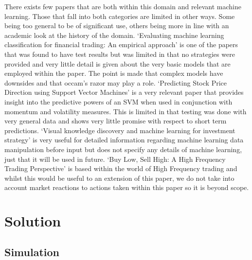 \documentclass[conference]{IEEEtran}
\begin{document}
There exists few papers that are both within this domain and relevant machine learning. Those that fall into both categories are limited in other ways. Some being too general to be of significant use, others being more in line with an academic look at the history of the domain. `Evaluating machine learning classification for financial trading: An empirical approach' \cite{Gerlein2016} is one of the papers that was found to have test results but was limited in that no strategies were provided and very little detail is given about the very basic models that are employed within the paper. The point is made that complex models have downsides and that occam's razor may play a role. `Predicting Stock Price Direction using Support Vector Machines' \cite{MadgeAdvisor} is a very relevant paper that provides insight into the predictive powers of an SVM when used in conjunction with momentum and volatility measures. This is limited in that testing was done with very general data and shows very little promise with respect to short term predictions. `Visual knowledge discovery and machine learning for investment strategy' \cite{Wilinski2017} is very useful for detailed information regarding machine learning data manipulation before input but does not specify any details of machine learning, just that it will be used in future. `Buy Low, Sell High: A High Frequency Trading Perspective' \cite{Cartea2014} is based within the world of High Frequency trading and whilst this would be useful to an extension of this paper, we do not take into account market reactions to actions taken within this paper so it is beyond scope.

\iffalse
#################################################################################
\fi

\section{Solution}

\iffalse
This section presents the solutions to the problems in detail.  The design and implementation details should all be placed in this section.  You may create a number of subsections, each focussing on one issue.
This section should be between 4 to 7 pages in length.
\fi

\iffalse
#################################################################################
\fi

\subsection{Simulation}
\end{document}
